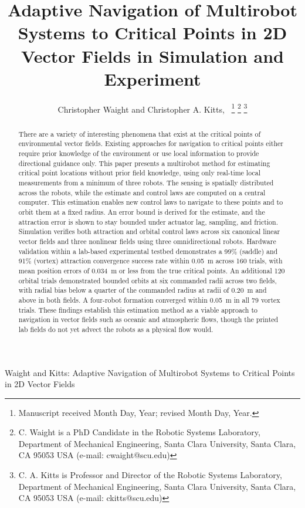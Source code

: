 \documentclass[lettersize,journal]{IEEEtran}
\newcommand{\rev}[1]{#1}
\begin{document}
\title{Adaptive Navigation of Multirobot Systems to Critical Points in 2D Vector Fields in Simulation and Experiment}
\author{Christopher Waight and Christopher A. Kitts,~
\thanks{Manuscript received Month Day, Year; revised Month Day, Year.}
\thanks{C. Waight is a PhD Candidate in the Robotic Systems Laboratory, Department of Mechanical Engineering, Santa Clara University, Santa Clara, CA 95053 USA (e-mail: cwaight@scu.edu)}
\thanks{C. A. Kitts is Professor and Director of the Robotic Systems Laboratory, Department of Mechanical Engineering, Santa Clara University, Santa Clara, CA 95053 USA (e-mail: ckitts@scu.edu)}
}
%
{Waight and Kitts: Adaptive Navigation of Multirobot Systems to Critical Points in 2D Vector Fields}


\maketitle

\begin{abstract}
    There are a variety of interesting phenomena that exist at the critical points of environmental vector fields. Existing approaches for navigation to critical points either require prior knowledge of the environment or use local information to provide directional guidance only. This paper presents a multirobot method for estimating critical point locations without prior field knowledge, using only real-time local measurements from a minimum of three robots. The sensing is spatially distributed across the robots, while the estimate and control laws are computed on a central computer.
    This estimation enables new control laws to navigate to these points and to orbit them at a fixed radius.
    An error bound is derived for the estimate, and the attraction error is shown to stay bounded under actuator lag, sampling, and friction.
    Simulation verifies both attraction and orbital control laws across six canonical linear vector fields and three nonlinear fields using three omnidirectional robots. Hardware validation within a lab-based experimental testbed demonstrates a \rev{99}\% (saddle) and \rev{91}\% (vortex) attraction convergence success rate within 0.05~m across \rev{160} trials, with mean position errors of \rev{0.034}~m or less from the true critical points. An additional \rev{120} orbital trials demonstrated bounded orbits at \rev{six} commanded radii across two fields, with radial bias below a quarter of the commanded radius at radii of \rev{0.20}~m and above in both fields. A four-robot formation converged within 0.05~m in all \rev{79} vortex trials.
    These findings establish this estimation method as a viable approach to navigation in vector fields such as oceanic and atmospheric flows, though the printed lab fields do not yet advect the robots as a physical flow would.

\end{abstract}
\end{document}
